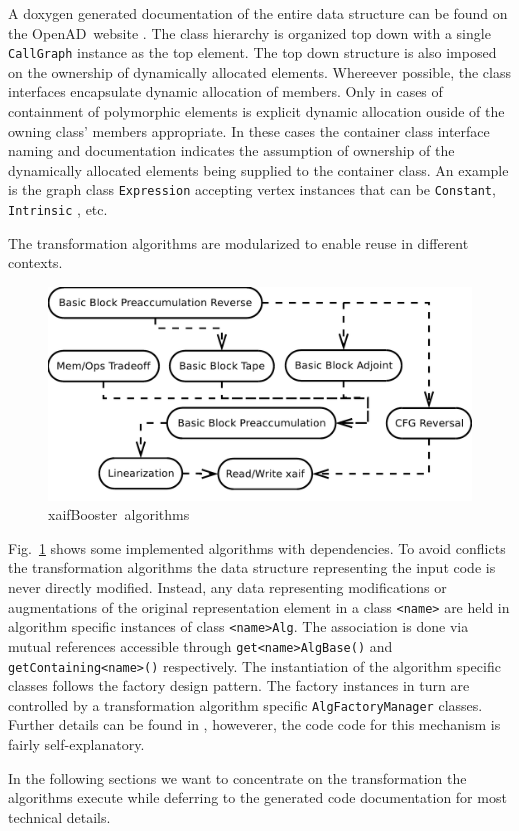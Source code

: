 \documentclass[11pt]{article}
\newcommand{\OpenAD}{OpenAD}
\newcommand{\xaifBooster}{xaifBooster}
\newcommand{\code}[1]{{\small\tt{#1}}}
\newcommand{\reffig}[1]{{Fig.~\ref{#1}}}
\begin{document}
A doxygen generated documentation of the entire data structure 
can be found on the \OpenAD\ website \cite{openadWeb}.
The class hierarchy is organized top down with 
a single \code{CallGraph} instance as the top element. 
The top down structure is also imposed on the ownership of dynamically 
allocated elements. 
Whereever possible, the class interfaces encapsulate dynamic 
allocation of members.  
Only in cases of containment of polymorphic elements is explicit dynamic allocation 
ouside of the owning class' members appropriate. 
In these cases the container class interface naming and documentation 
indicates the assumption of ownership of 
the dynamically allocated elements being supplied to the container class. 
An example is the graph class \code{Expression} accepting vertex instances that can be 
\code{Constant}, \code{Intrinsic} , etc.

The transformation algorithms are modularized to enable reuse in different 
contexts. 
\begin{figure}
  \centering \includegraphics[width=.45\textwidth]{allAlgs}
  \caption{\xaifBooster\ algorithms} \label{fig:allAlgs}
\end{figure}
\reffig{fig:allAlgs} shows some implemented algorithms with dependencies.
To avoid conflicts the transformation algorithms the data structure representing the input code  
is never directly modified. 
Instead, any data representing modifications or augmentations of the 
original representation element in a class \code{<name>}
are held in algorithm specific instances of class \code{<name>Alg}.
The association is done via mutual references accessible 
through \code{get<name>AlgBase()} and \code{getContaining<name>()} respectively.
The instantiation of the algorithm specific classes follows 
the factory design pattern. The factory instances in turn are controlled 
by a transformation algorithm specific \code{AlgFactoryManager} classes. 
Further details can be found in \cite{sea2003}, howeverer, the code 
code for this mechanism is fairly self-explanatory.  

In the following sections we want to concentrate on the transformation 
the algorithms execute while deferring to the generated code 
documentation for most technical details.
\end{document}
